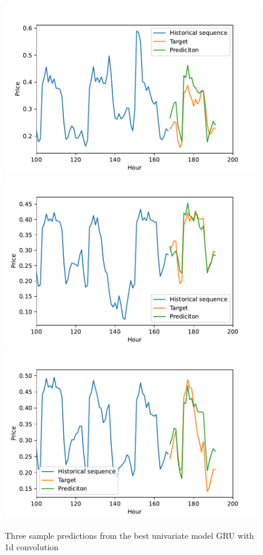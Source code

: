 \documentclass
[twocolumn,
secnumarabic,
nobibnotes,
aps,
prl,
reprint,
groupedaddress,
amsmath,
amssymb,
]{revtex4-2}
\begin{document}
\begin{figure}
  \includegraphics[width=\columnwidth]{figures/univariate_predictions_convGRU_testsample11.pdf}
  \includegraphics[width=\columnwidth]{figures/univariate_predictions_convGRU_testsample24.pdf}
  \includegraphics[width=\columnwidth]{figures/univariate_predictions_convGRU_testsample98.pdf}  
  \caption{\label{fig:univariate_best_predictions} Three sample predictions from the best univariate model GRU with 1d convolution}
\end{figure}
\end{document}
